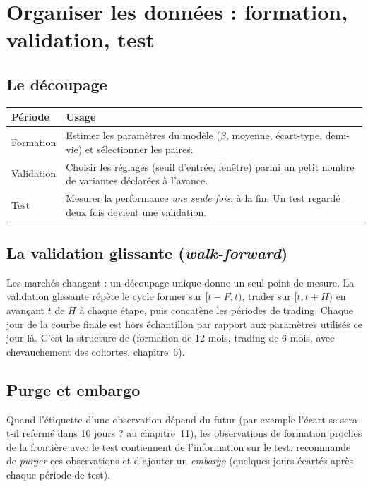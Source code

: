 \section{Organiser les données : formation, validation, test}

\subsection{Le découpage}

\begin{center}\small
\begin{tabular}{p{3.0cm}p{9.8cm}}
\toprule
Période & Usage \\
\midrule
Formation & Estimer les paramètres du modèle ($\beta$, moyenne, écart-type, demi-vie) et sélectionner les paires. \\
Validation & Choisir les réglages (seuil d'entrée, fenêtre) parmi un petit nombre de variantes déclarées à l'avance. \\
Test & Mesurer la performance \emph{une seule fois}, à la fin. Un test regardé deux fois devient une validation. \\
\bottomrule
\end{tabular}
\end{center}

\subsection{La validation glissante (\emph{walk-forward})}

Les marchés changent : un découpage unique donne un seul point de mesure. La validation glissante répète le cycle \og former sur $[t-F, t)$, trader sur $[t, t+H)$\fg{} en avançant $t$ de $H$ à chaque étape, puis concatène les périodes de trading. Chaque jour de la courbe finale est hors échantillon par rapport aux paramètres utilisés ce jour-là. C'est la structure de \citet{gatev2006} (formation de 12 mois, trading de 6 mois, avec chevauchement des cohortes, chapitre~6).

\subsection{Purge et embargo}

Quand l'étiquette d'une observation dépend du futur (par exemple \og l'écart se sera-t-il refermé dans 10 jours ?\fg{} au chapitre~11), les observations de formation proches de la frontière avec le test contiennent de l'information sur le test. \citet{lopezdeprado2018} recommande de \emph{purger} ces observations et d'ajouter un \emph{embargo} (quelques jours écartés après chaque période de test).

